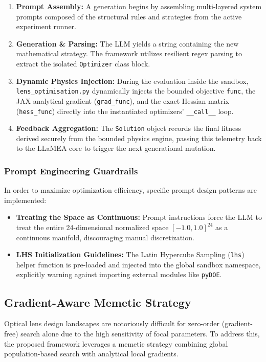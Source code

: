 \documentclass[12pt]{article}
\begin{document}
\begin{enumerate}
    \item \textbf{Prompt Assembly:} A generation begins by assembling multi-layered system prompts composed of the structural rules and strategies from the active experiment runner.
    \item \textbf{Generation \& Parsing:} The LLM yields a string containing the new mathematical strategy. The framework utilizes resilient regex parsing to extract the isolated \texttt{Optimizer} class block.
    \item \textbf{Dynamic Physics Injection:} During the evaluation inside the sandbox, \texttt{lens\_optimisation.py} dynamically injects the bounded objective \texttt{func}, the JAX analytical gradient (\texttt{grad\_func}), and the exact Hessian matrix (\texttt{hess\_func}) directly into the instantiated optimizers' \texttt{\_\_call\_\_} loop.
    \item \textbf{Feedback Aggregation:} The \texttt{Solution} object records the final fitness derived securely from the bounded physics engine, passing this telemetry back to the LLaMEA core to trigger the next generational mutation.
\end{enumerate}

\subsubsection{Prompt Engineering Guardrails}
In order to maximize optimization efficiency, specific prompt design patterns are implemented:
\begin{itemize}
    \item \textbf{Treating the Space as Continuous:} Prompt instructions force the LLM to treat the entire 24-dimensional normalized space $[-1.0, 1.0]^{24}$ as a continuous manifold, discouraging manual discretization.
    \item \textbf{LHS Initialization Guidelines:} The Latin Hypercube Sampling (\texttt{lhs}) helper function is pre-loaded and injected into the global sandbox namespace, explicitly warning against importing external modules like \texttt{pyDOE}.
\end{itemize}

\subsection{Gradient-Aware Memetic Strategy}
Optical lens design landscapes are notoriously difficult for zero-order (gradient-free) search alone due to the high sensitivity of focal parameters. To address this, the proposed framework leverages a memetic strategy combining global population-based search with analytical local gradients.
\end{document}
